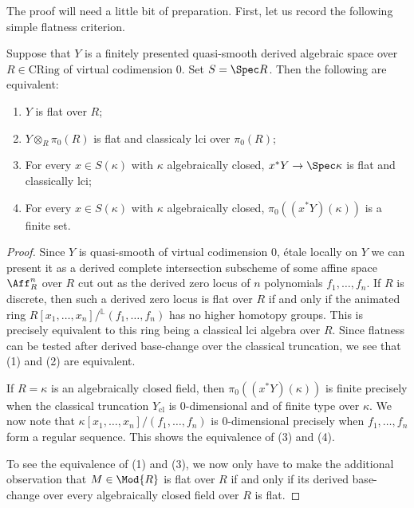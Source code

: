 \documentclass[10pt]{amsart}
\begin{document}
The proof will need a little bit of preparation. First, let us record the following simple flatness criterion.

\begin{lemma}
\label{lem:classicality_criterion}
Suppose that $Y$ is a finitely presented quasi-smooth derived algebraic space over $R\in \mathrm{CRing}$ of virtual codimension $0$. Set $S = \Spec R$. Then the following are equivalent:
\begin{enumerate}
   \item $Y$ is flat over $R$;
   \item $Y\otimes_R\pi_0(R)$ is flat and classicaly lci over $\pi_0(R)$;
   \item For every $x\in S(\kappa)$ with $\kappa$ algebraically closed, $x^*Y\to \Spec \kappa$ is flat and classically lci;
   \item For every $x\in S(\kappa)$ with $\kappa$ algebraically closed, $\pi_0((x^*Y)(\kappa))$ is a finite set.
\end{enumerate}
\end{lemma}
\begin{proof}
Since $Y$ is quasi-smooth of virtual codimension $0$, \'etale locally on $Y$ we can present it as a derived complete intersection subscheme of some affine space $\Aff^n_R$ over $R$ cut out as the derived zero locus of $n$ polynomials $f_1,\ldots,f_n$. If $R$ is discrete, then such a derived zero locus is flat over $R$ if and only if the animated ring $R[x_1,\ldots,x_n]/{}^{\mathbb{L}}(f_1,\ldots,f_n)$ has no higher homotopy groups. This is precisely equivalent to this ring being a classical lci algebra over $R$. Since flatness can be tested after derived base-change over the classical truncation, we see that (1) and (2) are equivalent.

If $R = \kappa$ is an algebraically closed field, then $\pi_0((x^*Y)(\kappa))$ is finite precisely when the classical truncation $Y_{\mathrm{cl}}$ is $0$-dimensional and of finite type over $\kappa$. We now note that $\kappa[x_1,\ldots,x_n]/(f_1,\ldots,f_n)$ is $0$-dimensional precisely when $f_1,\ldots,f_n$ form a regular sequence. This shows the equivalence of (3) and (4).

To see the equivalence of (1) and (3), we now only have to make the additional observation that $M\in \Mod{R}$ is flat over $R$ if and only if its derived base-change over every algebraically closed field over $R$ is flat.
\end{proof}
\end{document}
